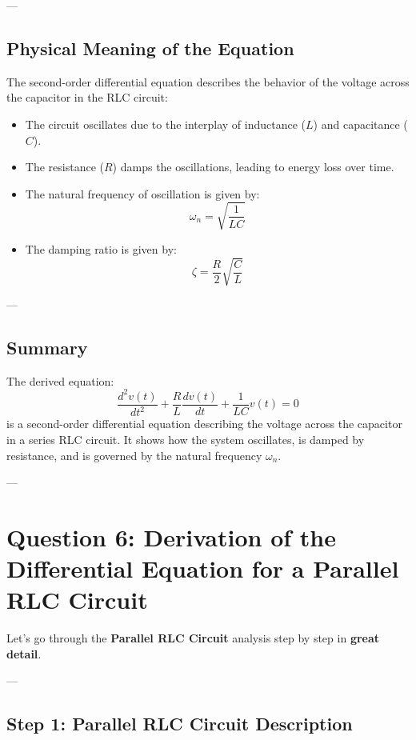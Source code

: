 \documentclass[12pt]{article}
\begin{document}
---

\subsection*{Physical Meaning of the Equation}

The second-order differential equation describes the behavior of the voltage across the capacitor in the RLC circuit:
\begin{itemize}
    \item The circuit oscillates due to the interplay of inductance (\( L \)) and capacitance (\( C \)).
    \item The resistance (\( R \)) damps the oscillations, leading to energy loss over time.
    \item The natural frequency of oscillation is given by:
    \[
    \omega_n = \sqrt{\frac{1}{L C}} \tag{6}
    \]
    \item The damping ratio is given by:
    \[
    \zeta = \frac{R}{2} \sqrt{\frac{C}{L}} \tag{7}
    \]
\end{itemize}

---

\subsection*{Summary}

The derived equation:
\[
\frac{d^2v(t)}{dt^2} + \frac{R}{L} \frac{dv(t)}{dt} + \frac{1}{L C} v(t) = 0
\]
is a second-order differential equation describing the voltage across the capacitor in a series RLC circuit. It shows how the system oscillates, is damped by resistance, and is governed by the natural frequency \( \omega_n \).

---

\newpage
\section*{Question 6: Derivation of the Differential Equation for a Parallel RLC Circuit}

Let’s go through the \textbf{Parallel RLC Circuit} analysis step by step in \textbf{great detail}.

---

\subsection*{Step 1: Parallel RLC Circuit Description}
\end{document}
